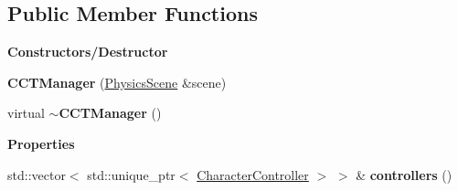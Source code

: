 \subsection*{Public Member Functions}
\begin{Indent}\textbf{ Constructors/\+Destructor}\par
\begin{DoxyCompactItemize}
\item 
\mbox{\label{classrev_1_1_c_c_t_manager_ac7d025b5e1b8a8d786952361eafad037}} 
{\bfseries C\+C\+T\+Manager} (\mbox{\hyperlink{classrev_1_1_physics_scene}{Physics\+Scene}} \&scene)
\item 
\mbox{\label{classrev_1_1_c_c_t_manager_a5313752f02a302cb66cb6d6316ab91df}} 
virtual {\bfseries $\sim$\+C\+C\+T\+Manager} ()
\end{DoxyCompactItemize}
\end{Indent}
\begin{Indent}\textbf{ Properties}\par
\begin{DoxyCompactItemize}
\item 
\mbox{\label{classrev_1_1_c_c_t_manager_af88234772b1761eccdb7280d8be79ede}} 
std\+::vector$<$ std\+::unique\+\_\+ptr$<$ \mbox{\hyperlink{classrev_1_1_character_controller}{Character\+Controller}} $>$ $>$ \& {\bfseries controllers} ()
\end{DoxyCompactItemize}
\end{Indent}
